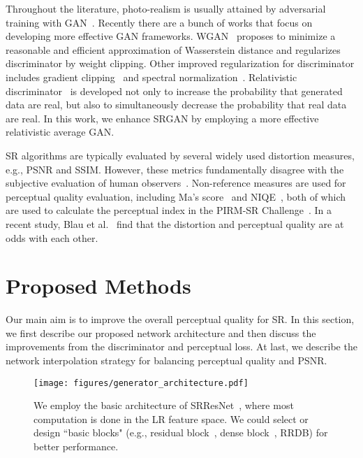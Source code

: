 \documentclass[runningheads]{llncs}
\begin{document}
Throughout the literature, photo-realism is usually attained by adversarial training with  
GAN~\cite{goodfellow2014generative}.
%
Recently there are a bunch of works that focus on developing more effective GAN frameworks. 
%
WGAN~\cite{arjovsky2017wasserstein} proposes to minimize a reasonable and efficient approximation of Wasserstein 
distance and regularizes discriminator by weight clipping.
%
Other improved regularization for discriminator includes gradient clipping~\cite{gulrajani2017improved} and spectral 
normalization~\cite{miyato2018spectral}.
%
Relativistic discriminator~\cite{jolicoeur2018relativistic} is developed not only to increase the probability that  
generated data are real, but also to simultaneously decrease the probability that real data are real. 
%
In this work, we enhance SRGAN by employing a more effective relativistic average GAN.

SR algorithms are typically evaluated by several widely used distortion measures, e.g., PSNR and SSIM.
%
However, these metrics fundamentally disagree with the subjective evaluation of human observers~\cite{ledig2017photo}.
%
Non-reference measures are used for perceptual quality evaluation, including Ma's score~\cite{ma2017learning} 
and NIQE~\cite{mittal2013making}, both of which are used to calculate the perceptual index in the PIRM-SR 
Challenge~\cite{pirm18url}.
%
In a recent study, Blau et al.~\cite{blau2017perception} find that the distortion and perceptual quality are at odds 
with each other. 


\section{Proposed Methods}

Our main aim is to improve the overall perceptual quality for SR. 
%
In this section, we first describe our proposed network architecture and then discuss the improvements from the 
discriminator and perceptual loss.
%
At last, we describe the network interpolation strategy for balancing perceptual quality and PSNR.


\begin{figure}[htbp]
	\vspace{-0.3cm}
	\begin{center}
		\texttt{[image: figures/generator\_architecture.pdf]}
	\end{center}
	\vspace{-0.4cm}
	\caption{We employ the basic architecture of SRResNet~\cite{ledig2017photo}, where most computation is done in the 
		LR feature space. We could select or design ``basic blocks" (e.g., residual block~\cite{he2016deep}, dense
		block~\cite{huang2016densely}, RRDB) for better performance.}
	\label{fig:generator_architecture}
	\vspace{-0.8cm}
\end{figure}
\end{document}
